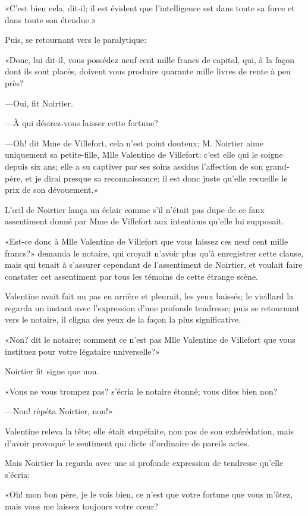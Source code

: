 «C'est bien cela, dit-il; il est évident que l'intelligence est dans toute sa force et dans toute son étendue.» 

Puis, se retournant vers le paralytique: 

«Donc, lui dit-il, vous possédez neuf cent mille francs de capital, qui, à la façon dont ils sont placés, doivent vous produire quarante mille livres de rente à peu près? 

—Oui, fit Noirtier. 

—À qui désirez-vous laisser cette fortune? 

—Oh! dit Mme de Villefort, cela n'est point douteux; M. Noirtier aime uniquement sa petite-fille, Mlle Valentine de Villefort: c'est elle qui le soigne depuis six ans; elle a su captiver par ses soins assidus l'affection de son grand-père, et je dirai presque sa reconnaissance; il est donc juste qu'elle recueille le prix de son dévouement.» 

L'œil de Noirtier lança un éclair comme s'il n'était pas dupe de ce faux assentiment donné par Mme de Villefort aux intentions qu'elle lui supposait. 

«Est-ce donc à Mlle Valentine de Villefort que vous laissez ces neuf cent mille francs?» demanda le notaire, qui croyait n'avoir plus qu'à enregistrer cette clause, mais qui tenait à s'assurer cependant de l'assentiment de Noirtier, et voulait faire constater cet assentiment par tous les témoins de cette étrange scène.  

Valentine avait fait un pas en arrière et pleurait, les yeux baissés; le vieillard la regarda un instant avec l'expression d'une profonde tendresse; puis se retournant vers le notaire, il cligna des yeux de la façon la plus significative. 

«Non? dit le notaire; comment ce n'est pas Mlle Valentine de Villefort que vous instituez pour votre légataire universelle?» 

Noirtier fit signe que non. 

«Vous ne vous trompez pas? s'écria le notaire étonné; vous dites bien non? 

—Non! répéta Noirtier, non!» 

Valentine releva la tête; elle était stupéfaite, non pas de son exhérédation, mais d'avoir provoqué le sentiment qui dicte d'ordinaire de pareils actes. 

Mais Noirtier la regarda avec une si profonde expression de tendresse qu'elle s'écria: 

«Oh! mon bon père, je le vois bien, ce n'est que votre fortune que vous m'ôtez, mais vous me laissez toujours votre cœur? 

